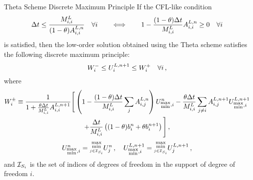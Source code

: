 \begin{theorem}{Theta Scheme Discrete Maximum Principle}
If the CFL-like condition
\begin{equation}\label{eq:theta_cfl}
   \Delta t \leq \frac{M^L_{i,i}}{(1-\theta)
     A_{i,i}^{L,n}}\quad\forall i
   \qquad\Longleftrightarrow\qquad
   1 - \frac{(1-\theta)\Delta t}{M^L_{i,i}}
     A_{i,i}^{L,n}
     \geq 0\quad\forall i
\end{equation}
is satisfied, then the low-order solution obtained using the Theta scheme
satisfies the following discrete maximum principle:
\begin{equation}\label{eq:theta_dmp}
  W_i^-\leq U_i^{L,n+1}\leq W_i^+
  \quad\forall i \,,
\end{equation}
where
\begin{multline}\label{eq:theta_bounds}
   W_i^\pm
   \equiv \frac{1}{1+\frac{\theta\Delta t}{M^L_{i,i}}
     A_{i,i}^{L,n+1}}\Bigg[\left(1
     - \frac{(1-\theta)\Delta t}{M^L_{i,i}}
       \sum\limits_jA_{i,j}^{L,n}\right)U_{\substack{\max\\\min},i}^n
     - \frac{\theta\Delta t}{M^L_{i,i}}
       \sum\limits_{j\ne i}A_{i,j}^{L,n+1}
       U_{\substack{\max\\\min},i}^{L,n+1}
     \\
     + \frac{\Delta t}{M^L_{i,i}}\left((1-\theta)
       b_i^n + \theta b_i^{n+1}\right)\Bigg] \,,
\end{multline}
\[
  \solutionletter_{\substack{\max\\\min},i}^\timeindex
  = \substack{\max\\\min\limits_{j\in\indicescell[\support_i]}}
    \solutionletter_j^\timeindex
  \eqc \quad
  \solutionletter_{\substack{\max\\\min},i}^{L,\timeindex+1}
  = \substack{\max\\\min\limits_{j\in\indicescell[\support_i]}}
  \solutionletter_j^{L,\timeindex+1}
  \eqc
\]
and $\indicescell[\support_i]$ is the set of indices of degrees of freedom in the
support of degree of freedom $i$.
\end{theorem}
